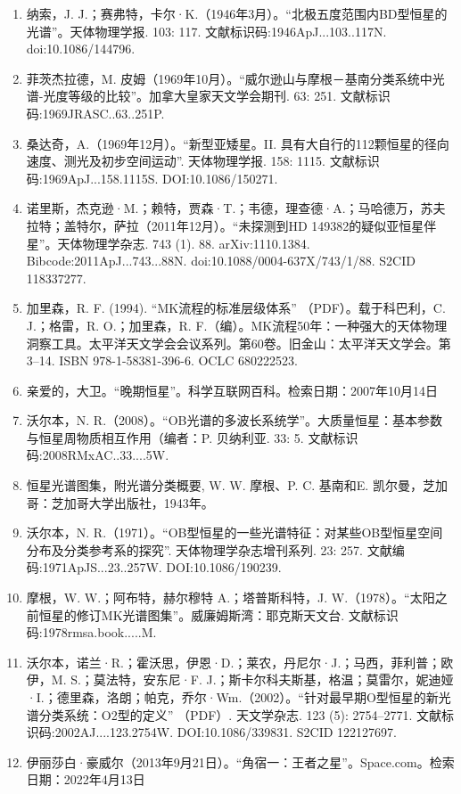 \begin{enumerate}
\item 纳索，J. J.；赛弗特，卡尔·K.（1946年3月）。“北极五度范围内BD型恒星的光谱”。天体物理学报. 103: 117. 文献标识码:1946ApJ...103..117N. doi:10.1086/144796.
\item 菲茨杰拉德，M. 皮姆（1969年10月）。“威尔逊山与摩根－基南分类系统中光谱-光度等级的比较”。加拿大皇家天文学会期刊. 63: 251. 文献标识码:1969JRASC..63..251P.
\item 桑达奇，A.（1969年12月）。“新型亚矮星。II. 具有大自行的112颗恒星的径向速度、测光及初步空间运动”. 天体物理学报. 158: 1115. 文献标识码:1969ApJ...158.1115S. DOI:10.1086/150271.
\item 诺里斯，杰克逊·M.；赖特，贾森·T.；韦德，理查德·A.；马哈德万，苏夫拉特；盖特尔，萨拉（2011年12月）。“未探测到HD 149382的疑似亚恒星伴星”。天体物理学杂志. 743 (1). 88. arXiv:1110.1384. Bibcode:2011ApJ...743...88N. doi:10.1088/0004-637X/743/1/88. S2CID 118337277.
\item 加里森，R. F. (1994). “MK流程的标准层级体系” （PDF）。载于科巴利，C. J.；格雷，R. O.；加里森，R. F.（编）。MK流程50年：一种强大的天体物理洞察工具。太平洋天文学会会议系列。第60卷。旧金山：太平洋天文学会。第3–14. ISBN 978-1-58381-396-6. OCLC 680222523.
\item 亲爱的，大卫。“晚期恒星”。科学互联网百科。检索日期：2007年10月14日
\item 沃尔本，N. R.（2008）。“OB光谱的多波长系统学”。大质量恒星：基本参数与恒星周物质相互作用（编者：P. 贝纳利亚. 33: 5. 文献标识码:2008RMxAC..33....5W.
\item 恒星光谱图集，附光谱分类概要, W. W. 摩根、P. C. 基南和E. 凯尔曼，芝加哥：芝加哥大学出版社，1943年。
\item 沃尔本，N. R.（1971）。“OB型恒星的一些光谱特征：对某些OB型恒星空间分布及分类参考系的探究”. 天体物理学杂志增刊系列. 23: 257. 文献编码:1971ApJS...23..257W. DOI:10.1086/190239.
\item 摩根，W. W.；阿布特，赫尔穆特 A.；塔普斯科特，J. W.（1978）。“太阳之前恒星的修订MK光谱图集”。威廉姆斯湾：耶克斯天文台. 文献标识码:1978rmsa.book.....M.
\item 沃尔本，诺兰·R.；霍沃思，伊恩·D.；莱农，丹尼尔·J.；马西，菲利普；欧伊，M. S.；莫法特，安东尼·F. J.；斯卡尔科夫斯基，格温；莫雷尔，妮迪娅·I.；德里森，洛朗；帕克，乔尔·Wm.（2002）。“针对最早期O型恒星的新光谱分类系统：O2型的定义” （PDF）. 天文学杂志. 123 (5): 2754–2771. 文献标识码:2002AJ....123.2754W. DOI:10.1086/339831. S2CID 122127697.
\item 伊丽莎白·豪威尔（2013年9月21日）。“角宿一：王者之星”。Space.com。检索日期：2022年4月13日

\end{enumerate}
